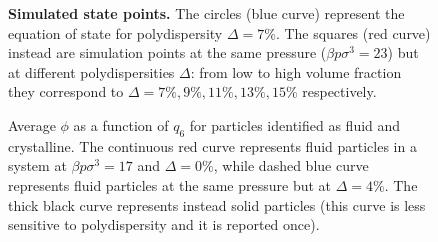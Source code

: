 \documentclass[twocolumn,superscriptaddress]{revtex4-1}
\begin{document}
\tikzset{external/force remake=false}
\begin{figure}
	\caption{\textbf{Simulated state points.} The circles (blue curve) represent the equation of state for polydispersity $\Delta=7\%$. The squares (red curve) instead are simulation points at the same pressure ($\beta p\sigma^3=23$) but at different polydispersities $\Delta$: from low to high volume fraction they correspond to $\Delta=7\%,9\%,11\%,13\%,15\%$ respectively.}
	\label{fig:eos}
\end{figure}

\tikzset{external/force remake}
\begin{figure}
	 \caption{Average $\phi$ as a function of $q_6$ for particles identified as fluid and crystalline. The continuous red curve represents fluid particles in a system at $\beta p\sigma^3=17$ and $\Delta=0\%$, while dashed blue curve represents fluid particles at the same pressure but at $\Delta=4\%$. The thick black curve represents instead solid particles (this curve is less sensitive to polydispersity and it is reported once).}
 \label{fig:stability_map}
\end{figure}
\end{document}
